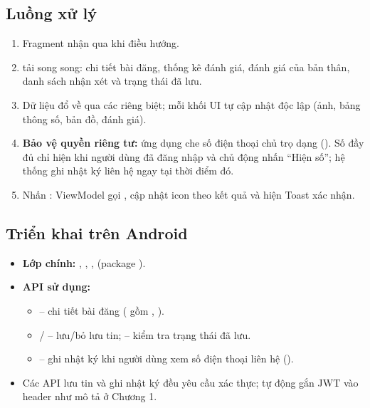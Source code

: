 
\subsection{Luồng xử lý}
\begin{enumerate}
    \item Fragment nhận  qua  khi điều hướng.
    \item {} tải song song: chi tiết bài đăng, thống kê
    đánh giá, đánh giá của bản thân, danh sách nhận xét và trạng thái đã lưu.
    \item Dữ liệu đổ về qua các  riêng biệt; mỗi khối UI tự
    cập nhật độc lập (ảnh, bảng thông số, bản đồ, đánh giá).
    \item \textbf{Bảo vệ quyền riêng tư:} ứng dụng che số điện thoại chủ trọ
    dạng  (). Số đầy đủ chỉ hiện khi
    người dùng đã đăng nhập và chủ động nhấn ``Hiện số''; hệ thống ghi nhật ký
    liên hệ ngay tại thời điểm đó.
    \item Nhấn : ViewModel gọi ,
    cập nhật icon theo kết quả và hiện Toast xác nhận.
\end{enumerate}

\subsection{Triển khai trên Android}
\begin{itemize}
    \item \textbf{Lớp chính:} ,
    , ,
     (package ).
    \item \textbf{API sử dụng:}
    \begin{itemize}
        \item {} -- chi tiết bài đăng
        ( gồm , ).
        \item {} /
         -- lưu/bỏ lưu tin;
         -- kiểm tra trạng thái đã lưu.
        \item {} -- ghi nhật ký khi người
        dùng xem số điện thoại liên hệ ().
    \end{itemize}
    \item Các API lưu tin và ghi nhật ký đều yêu cầu xác thực;
     tự động gắn JWT vào header như mô tả ở Chương 1.
\end{itemize}

